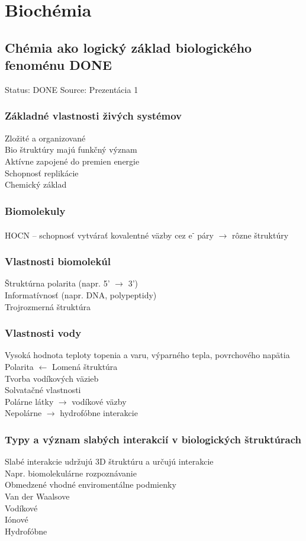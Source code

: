 \newcommand\tab[1][1cm]{\hspace*{#1}}
\chapter[Biochémia]{Biochémia}
\label{biochemia} %

\section{Chémia ako logický základ biologického fenoménu DONE}
Status: DONE
Source: Prezentácia 1
\\
\subsection*{Základné vlastnosti živých systémov}
Zložité a organizované\\
Bio štruktúry majú funkčný význam\\
Aktívne zapojené do premien energie\\
Schopnosť replikácie\\
Chemický základ
\subsection*{Biomolekuly}
HOCN -- schopnosť vytvárať kovalentné väzby cez e\textsuperscript{-} páry $\rightarrow$ rôzne štruktúry
\subsection*{Vlastnosti biomolekúl}
Štruktúrna polarita (napr. 5' $\rightarrow$ 3')\\
Informatívnosť (napr. DNA, polypeptidy)\\
Trojrozmerná štruktúra\\
\subsection*{Vlastnosti vody}
Vysoká hodnota teploty topenia a varu, výparného tepla, povrchového napätia\\
Polarita $\leftarrow$ Lomená štruktúra\\
Tvorba vodíkových väzieb\\
Solvatačné vlastnosti\\
\tab Polárne látky $\rightarrow$ vodíkové väzby\\
\tab Nepolárne $\rightarrow$ hydrofóbne interakcie
\subsection*{Typy a význam slabých interakcií v biologických štruktúrach}
Slabé interakcie udržujú 3D štruktúru a určujú interakcie\\
\tab Napr. biomolekulárne rozpoznávanie\\
\tab Obmedzené vhodné enviromentálne podmienky\\
Van der Waalsove\\
Vodíkové\\
Iónové\\
Hydrofóbne
